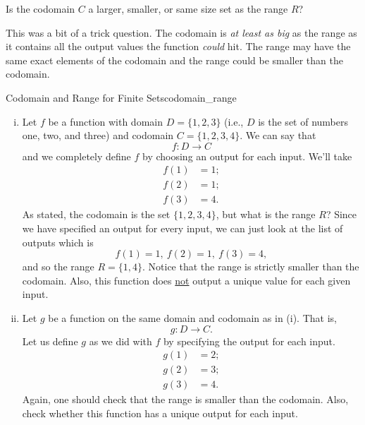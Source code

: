     \begin{question}
    Is the codomain $C$ a larger, smaller, or same size set as the range $R$?
    \end{question}
    
    \begin{answer}
    This was a bit of a trick question.  The codomain is \emph{at least as big} as the range as it contains all the output values the function \emph{could} hit.  The range may have the same exact elements of the codomain and the range could be smaller than the codomain.
    \end{answer}
    
    \begin{ex}{Codomain and Range for Finite Sets}{codomain_range}
    \begin{enumerate}[(i)]
        \item Let $f$ be a function with domain $D=\{1,2,3\}$ (i.e., $D$ is the set of numbers one, two, and three) and codomain $C=\{1,2,3,4\}$. We can say that 
    \[
    f\colon D \to C
    \]
    and we completely define $f$ by choosing an output for each input. We'll take
    \begin{align*}
        f(1)&=1;\\
        f(2)&=1;\\
        f(3)&=4.
    \end{align*}
    As stated, the codomain is the set $\{1,2,3,4\}$, but what is the range $R$? Since we have specified an output for every input, we can just look at the list of outputs which is
    \[
    f(1)=1,~f(2)=1,~f(3)=4,
    \]
    and so the range $R=\{1,4\}$.  Notice that the range is strictly smaller than the codomain. Also, this function does \underline{not} output a unique value for each given input.
    
        \item Let $g$ be a function on the same domain and codomain as in (i). That is,
        \[
        g\colon D \to C.
        \]
        Let us define $g$ as we did with $f$ by specifying the output for each input.
        \begin{align*}
            g(1)&=2;\\
            g(2)&=3;\\
            g(3)&=4.
        \end{align*}
        Again, one should check that the range is smaller than the codomain. Also, check whether this function has a unique output for each input. 
    \end{enumerate}
    \end{ex}
    
